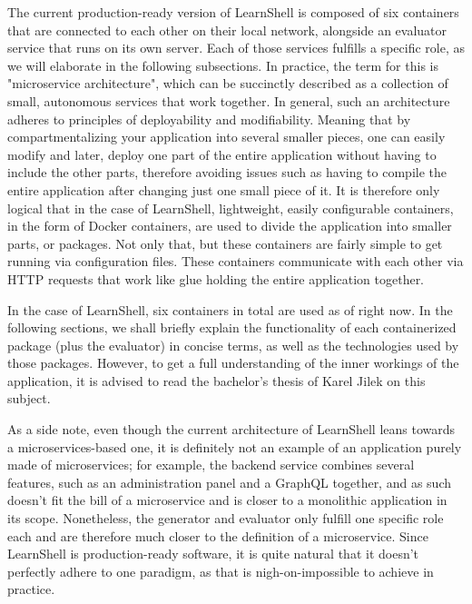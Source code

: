 \documentclass[thesis=B,english]{FITthesis}[2019/12/23]
\begin{document}
The current production-ready version of LearnShell is composed of six containers that are connected to each other on their local network, alongside an evaluator service that runs on its own server. Each of those services fulfills a specific role, as we will elaborate in the following subsections. In practice, the term for this is "microservice architecture", which can be succinctly described as a collection of small, autonomous services that work together. \cite{building-microservices} 
\newline
In general, such an architecture adheres to principles of deployability and modifiability. \cite{building-microservices,architecting-chen} Meaning that by compartmentalizing your application into several smaller pieces, one can easily modify and later, deploy one part of the entire application without having to include the other parts, therefore avoiding issues such as having to compile the entire application after changing just one small piece of it. It is therefore only logical that in the case of LearnShell, lightweight, easily configurable containers, in the form of Docker containers, are used to divide the application into smaller parts, or packages. Not only that, but these containers are fairly simple to get running via configuration files. These containers communicate with each other via HTTP requests that work like glue holding the entire application together. \cite{microservices}

In the case of LearnShell, six containers in total are used as of right now. In the following sections, we shall briefly explain the functionality of each containerized package (plus the evaluator) in concise terms, as well as the technologies used by those packages. However, to get a full understanding of the inner workings of the application, it is advised to read the bachelor's thesis of Karel Jilek on this subject.

As a side note, even though the current architecture of LearnShell leans towards a microservices-based one, it is definitely not an example of an application purely made of microservices; for example, the backend service combines several features, such as an administration panel and a GraphQL together, and as such doesn't fit the bill of a microservice and is closer to a monolithic application in its scope. Nonetheless, the generator and evaluator only fulfill one specific role each and are therefore much closer to the definition of a microservice. Since LearnShell is production-ready software, it is quite natural that it doesn't perfectly adhere to one paradigm, as that is nigh-on-impossible to achieve in practice.
\end{document}
